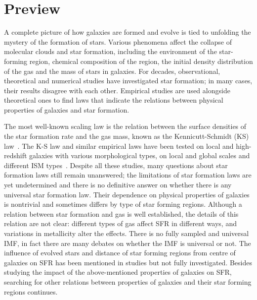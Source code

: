 
\section{Preview}
\label{sec: pre_intro}

A complete picture of how galaxies are formed and evolve is tied to unfolding the mystery of the formation of stars.
 Various phenomena affect the collapse of molecular clouds and star formation, including the environment of the star-forming region, chemical composition of the region, the initial density distribution of the gas and the mass of stars in galaxies.
 For decades, observational, theoretical and numerical studies have investigated star formation;  in many cases, their results disagree with each other.
 Empirical studies are used alongside theoretical ones to find laws that indicate the relations between physical properties of galaxies and star formation.

The most well-known scaling law is the relation between the surface densities of the star formation rate and the gas mass, known as the Kennicutt-Schmidt (KS) law~\citep{Schmidt59, Kennicutt98a}. 
The K-S law and similar empirical laws have been tested on local and high-redshift galaxies with various morphological types, on local and global scales and different ISM types~\citep[e.g][]{Kennicutt08,Bigiel08,Genzel10,Gnedin10,Shi11}.
Despite all these studies, many questions about star formation laws still remain unanswered; the limitations of star formation laws are yet undetermined and there is no definitive answer on whether there is any universal star formation law.
Their dependence on physical properties of galaxies is nontrivial and sometimes differs by type of star forming regions.
Although a relation between star formation and gas is well established, the details of this relation are not clear:
different types of gas affect SFR in different ways, and variations in metallicity alter the effects.
There is no fully sampled and universal IMF,
in fact there are many debates on whether the IMF is universal or not.
The influence of evolved stars and distance of star forming regions from centre of galaxies on SFR has been mentioned in studies but not fully investigated.
Besides studying the impact of the above-mentioned properties of galaxies on SFR, searching for other relations between properties of galaxies and their star forming regions continues.

